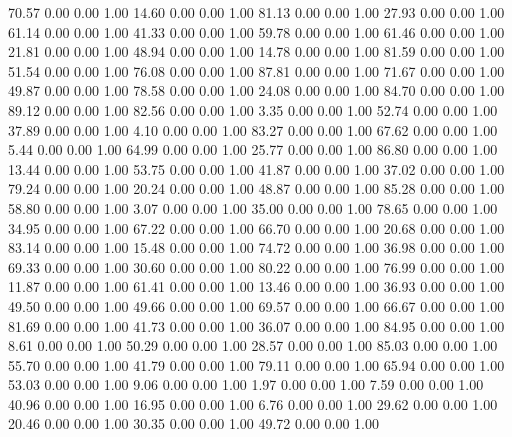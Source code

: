    70.57   0.00   0.00   1.00
   14.60   0.00   0.00   1.00
   81.13   0.00   0.00   1.00
   27.93   0.00   0.00   1.00
   61.14   0.00   0.00   1.00
   41.33   0.00   0.00   1.00
   59.78   0.00   0.00   1.00
   61.46   0.00   0.00   1.00
   21.81   0.00   0.00   1.00
   48.94   0.00   0.00   1.00
   14.78   0.00   0.00   1.00
   81.59   0.00   0.00   1.00
   51.54   0.00   0.00   1.00
   76.08   0.00   0.00   1.00
   87.81   0.00   0.00   1.00
   71.67   0.00   0.00   1.00
   49.87   0.00   0.00   1.00
   78.58   0.00   0.00   1.00
   24.08   0.00   0.00   1.00
   84.70   0.00   0.00   1.00
   89.12   0.00   0.00   1.00
   82.56   0.00   0.00   1.00
    3.35   0.00   0.00   1.00
   52.74   0.00   0.00   1.00
   37.89   0.00   0.00   1.00
    4.10   0.00   0.00   1.00
   83.27   0.00   0.00   1.00
   67.62   0.00   0.00   1.00
    5.44   0.00   0.00   1.00
   64.99   0.00   0.00   1.00
   25.77   0.00   0.00   1.00
   86.80   0.00   0.00   1.00
   13.44   0.00   0.00   1.00
   53.75   0.00   0.00   1.00
   41.87   0.00   0.00   1.00
   37.02   0.00   0.00   1.00
   79.24   0.00   0.00   1.00
   20.24   0.00   0.00   1.00
   48.87   0.00   0.00   1.00
   85.28   0.00   0.00   1.00
   58.80   0.00   0.00   1.00
    3.07   0.00   0.00   1.00
   35.00   0.00   0.00   1.00
   78.65   0.00   0.00   1.00
   34.95   0.00   0.00   1.00
   67.22   0.00   0.00   1.00
   66.70   0.00   0.00   1.00
   20.68   0.00   0.00   1.00
   83.14   0.00   0.00   1.00
   15.48   0.00   0.00   1.00
   74.72   0.00   0.00   1.00
   36.98   0.00   0.00   1.00
   69.33   0.00   0.00   1.00
   30.60   0.00   0.00   1.00
   80.22   0.00   0.00   1.00
   76.99   0.00   0.00   1.00
   11.87   0.00   0.00   1.00
   61.41   0.00   0.00   1.00
   13.46   0.00   0.00   1.00
   36.93   0.00   0.00   1.00
   49.50   0.00   0.00   1.00
   49.66   0.00   0.00   1.00
   69.57   0.00   0.00   1.00
   66.67   0.00   0.00   1.00
   81.69   0.00   0.00   1.00
   41.73   0.00   0.00   1.00
   36.07   0.00   0.00   1.00
   84.95   0.00   0.00   1.00
    8.61   0.00   0.00   1.00
   50.29   0.00   0.00   1.00
   28.57   0.00   0.00   1.00
   85.03   0.00   0.00   1.00
   55.70   0.00   0.00   1.00
   41.79   0.00   0.00   1.00
   79.11   0.00   0.00   1.00
   65.94   0.00   0.00   1.00
   53.03   0.00   0.00   1.00
    9.06   0.00   0.00   1.00
    1.97   0.00   0.00   1.00
    7.59   0.00   0.00   1.00
   40.96   0.00   0.00   1.00
   16.95   0.00   0.00   1.00
    6.76   0.00   0.00   1.00
   29.62   0.00   0.00   1.00
   20.46   0.00   0.00   1.00
   30.35   0.00   0.00   1.00
   49.72   0.00   0.00   1.00
